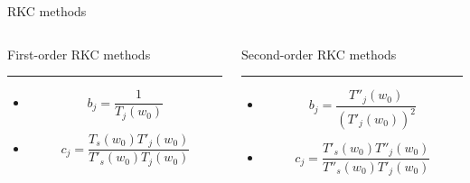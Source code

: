 \documentclass{beamer}
\begin{document}
\begin{frame}{RKC methods}
	\begin{columns}[T] %
		\begin{column}{.48\textwidth}			
			First-order RKC methods
			
			\color{red}\rule{\linewidth}{3pt}
			\begin{itemize}
				\item  $$b_j=\frac{1}{T_j(w_0)} $$
				\item  $$ c_j=\frac{T_s(w_0)T'_j(w_0)}{T'_s(w_0)T_j(w_0)}$$
			
			\end{itemize}
		\end{column}%
		\hfill%
		\begin{column}{.48\textwidth}			
			Second-order RKC methods
			\color{blue}\rule{\linewidth}{3pt}
			\begin{itemize}
				\item $$b_j=\frac{T''_j(w_0)}{(T'_j(w_0))^2} $$
				\item $$c_j=\frac{T'_s(w_0)T''_j(w_0)}{T''_s(w_0)T'_j(w_0)}$$
			\end{itemize}
		\end{column}%
	\end{columns}
	
\end{frame}
\end{document}
